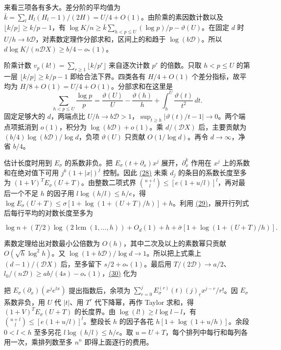 \documentclass[11pt,a4paper]{article}
\begin{document}
来看三项各有多大。差分阶的平均值为 \(\bar k=\sum_lH_l(H_l-1)/(2H)=U/4+O(1)\)。由阶乘的素因数计数以及 \(\lfloor k/p\rfloor\ge k/p-1\)，有 \(\log K/n\ge\bar k\sum_{h<p\le U}(\log p)/p-\vartheta(U)\)。在固定 \(d\) 时 \(U/h\to b\mathscr D\)，对素数定理作分部求和，区间上的和趋于 \(\log(b\mathscr D)\)。所以 \(d\log K/(n\mathscr D X)\ge b/4-o_*(1)\)。

阶乘计数 \(v_p(k!)=\sum_{r\ge1}\lfloor k/p^r\rfloor\) 来自逐次计数 \(p^r\) 的倍数。只取 \(h<p\le U\) 的第一层 \(\lfloor k/p\rfloor\ge k/p-1\) 即给合法下界。四类各有 \(H/4+O(1)\) 个差分指标，故平均为 \(H/8+O(1)=U/4+O(1)\)。分部求和在这里是 \[
 \sum_{h<p\le U}\frac{\log p}{p}
 =\frac{\vartheta(U)}U-\frac{\vartheta(h)}h+\int_h^U\frac{\vartheta(t)}{t^2}\,dt .
\] 固定足够大的 \(d\)，两端点比 \(U/h\to b\mathscr D>1\)，\(\sup_{t\ge h}|\vartheta(t)/t-1|\to0\)。两个端点项抵消到 \(o(1)\)，积分为 \(\log(b\mathscr D)+o(1)\)。乘 \(d/(\mathscr D X)\) 后，主要贡献为 \((b/4)\log(b\mathscr D)/\log d\)，负项 \(\vartheta(U)\) 只贡献 \(O(1/\log d)\)。再令 \(d\to\infty\)，净省 \(b/4\)。

估计长度时用到 \(E_\sigma\) 的系数非负。把 \(E_\sigma(t+\partial_x)x^j\) 展开，\(\partial_x^k\) 作用在 \(x^j\) 上的系数和在绝对值下可用 \(j^k(1+|x|)^j\) 控制。因此 \hyperref[eq:28]{(28)} 未乘 \(d_j\) 的条目的系数长度至多为 \((1+V)^T E_\sigma(U+T)\)。由整数二项式界 \(\binom{u+l}{l}\le[e(1+u/l)]^l\)，再对最后一个不足 \(h\) 的因子用 \(l\log(h/l)\le h/e\)，得 \(\log E_\sigma(U+T)\le\sigma[1+\log(1+(U+T)/h)]+h\)。利用 \hyperref[eq:29]{(29)}，展开行列式后每行平均的对数长度至多为

\[
 \log n+(T/2)\log(2\operatorname{lcm}(1,\ldots,h))+O_d(1)
       +h+\bar\sigma[1+\log(1+(U+T)/h)] .
\]

素数定理给出对数最小公倍数为 \(O(h)\)，其中二次及以上的素数幂只贡献 \(O(\sqrt h\log^2h)\)。又 \(\log(1+b\mathscr D)/\log d\to1\)。所以把上式乘上 \((d-1)/(\mathscr D X)\) 后，至多留下 \(s/2+o_*(1)\)。最后用 \(T/(2\mathscr D)\to a/2\)、\(l_0/(n\mathscr D)\ge ab/(4s)-o_*(1)\)，\hyperref[eq:30]{(30)} 化为

把 \(E_\sigma(\partial_x)(x^je^{tx})\) 提出指数后，余项为 \(\sum_{r=0}^j E_\sigma^{(r)}(t)(j)_{\underline r}x^{j-r}/r!\)。因 \(E_\sigma\) 系数非负，用 \(U\) 代 \(|t|\)、用 \(T^r\) 代下降幂，再作 Taylor 求和，得 \((1+V)^T E_\sigma(U+T)\) 的长度界。由 \(\log(l!)\ge l\log l-l\)，有 \(\binom{u+l}{l}\le[e(1+u/l)]^l\)。整段长 \(h\) 的因子各花 \(h[1+\log(1+u/h)]\)。余段 \(0<l<h\) 至多另花 \(l\log(h/l)\le h/e\)。取 \(u=U+T\)，每个排列中每行和每列各用一次，乘排列数至多 \(n^n\) 即得上面逐行的费用。
\end{document}
